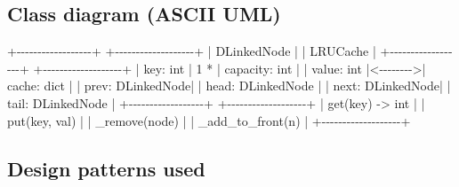 \documentclass[11pt]{article}
\newenvironment{Shaded}{\begin{snugshade}}{\end{snugshade}}
\newcommand{\BuiltInTok}[1]{\textcolor[rgb]{0.50,0.55,0.55}{#1}}
\newcommand{\DecValTok}[1]{\textcolor[rgb]{0.96,0.45,0.00}{#1}}
\newcommand{\NormalTok}[1]{\textcolor[rgb]{0.81,0.81,0.76}{#1}}
\newcommand{\OperatorTok}[1]{\textcolor[rgb]{0.81,0.81,0.76}{#1}}
\begin{document}
\subsection{Class diagram (ASCII UML)}\label{class-diagram-ascii-uml}


\begin{Shaded}
\begin{Highlighting}[]
\OperatorTok{+{-}{-}{-}{-}{-}{-}{-}{-}{-}{-}{-}{-}{-}{-}{-}{-}{-}{-}+}          \OperatorTok{+{-}{-}{-}{-}{-}{-}{-}{-}{-}{-}{-}{-}{-}{-}{-}{-}{-}{-}{-}+}
\OperatorTok{|}\NormalTok{   DLinkedNode    }\OperatorTok{|}          \OperatorTok{|}\NormalTok{    LRUCache       }\OperatorTok{|}
\OperatorTok{+{-}{-}{-}{-}{-}{-}{-}{-}{-}{-}{-}{-}{-}{-}{-}{-}{-}{-}+}          \OperatorTok{+{-}{-}{-}{-}{-}{-}{-}{-}{-}{-}{-}{-}{-}{-}{-}{-}{-}{-}{-}+}
\OperatorTok{|}\NormalTok{ key: }\BuiltInTok{int}         \OperatorTok{|}  \DecValTok{1}    \OperatorTok{*}  \OperatorTok{|}\NormalTok{ capacity: }\BuiltInTok{int}     \OperatorTok{|}
\OperatorTok{|}\NormalTok{ value: }\BuiltInTok{int}       \OperatorTok{|\textless{}{-}{-}{-}{-}{-}{-}{-}{-}\textgreater{}|}\NormalTok{ cache: }\BuiltInTok{dict}       \OperatorTok{|}
\OperatorTok{|}\NormalTok{ prev: DLinkedNode}\OperatorTok{|}          \OperatorTok{|}\NormalTok{ head: DLinkedNode }\OperatorTok{|}
\OperatorTok{|} \BuiltInTok{next}\NormalTok{: DLinkedNode}\OperatorTok{|}          \OperatorTok{|}\NormalTok{ tail: DLinkedNode }\OperatorTok{|}
\OperatorTok{+{-}{-}{-}{-}{-}{-}{-}{-}{-}{-}{-}{-}{-}{-}{-}{-}{-}{-}+}          \OperatorTok{+{-}{-}{-}{-}{-}{-}{-}{-}{-}{-}{-}{-}{-}{-}{-}{-}{-}{-}{-}+}
                              \OperatorTok{|}\NormalTok{ get(key) }\OperatorTok{{-}\textgreater{}} \BuiltInTok{int}   \OperatorTok{|}
                              \OperatorTok{|}\NormalTok{ put(key, val)     }\OperatorTok{|}
                              \OperatorTok{|}\NormalTok{ \_remove(node)     }\OperatorTok{|}
                              \OperatorTok{|}\NormalTok{ \_add\_to\_front(n)  }\OperatorTok{|}
                              \OperatorTok{+{-}{-}{-}{-}{-}{-}{-}{-}{-}{-}{-}{-}{-}{-}{-}{-}{-}{-}{-}+}
\end{Highlighting}
\end{Shaded}

\subsection{Design patterns used}\label{design-patterns-used}
\end{document}
